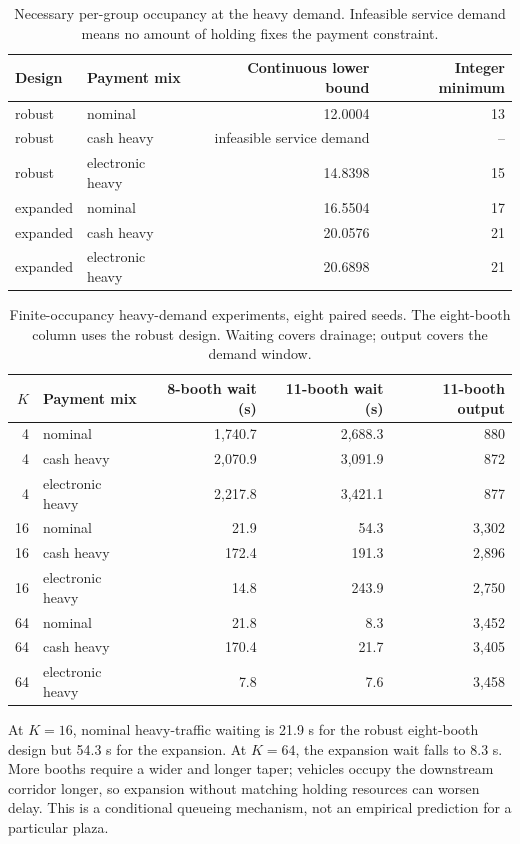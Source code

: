 \documentclass[12pt,letterpaper]{article}
\begin{document}
\begin{table}[H]\centering\small\caption{Necessary per-group occupancy at the heavy demand. Infeasible service demand means no amount of holding fixes the payment constraint.}\begin{tabular}{@{}llrr@{}}\toprule
Design & Payment mix & Continuous lower bound & Integer minimum\\\midrule
robust & nominal & 12.0004 & 13\\
robust & cash heavy & infeasible service demand & --\\
robust & electronic heavy & 14.8398 & 15\\
expanded & nominal & 16.5504 & 17\\
expanded & cash heavy & 20.0576 & 21\\
expanded & electronic heavy & 20.6898 & 21\\
\bottomrule\end{tabular}\end{table}
\begin{table}[H]\centering\small\caption{Finite-occupancy heavy-demand experiments, eight paired seeds. The eight-booth column uses the robust design. Waiting covers drainage; output covers the demand window.}\begin{tabular}{@{}rlrrr@{}}\toprule
$K$ & Payment mix & 8-booth wait (s) & 11-booth wait (s) & 11-booth output\\\midrule
4 & nominal & 1,740.7 & 2,688.3 & 880\\
4 & cash heavy & 2,070.9 & 3,091.9 & 872\\
4 & electronic heavy & 2,217.8 & 3,421.1 & 877\\
16 & nominal & 21.9 & 54.3 & 3,302\\
16 & cash heavy & 172.4 & 191.3 & 2,896\\
16 & electronic heavy & 14.8 & 243.9 & 2,750\\
64 & nominal & 21.8 & 8.3 & 3,452\\
64 & cash heavy & 170.4 & 21.7 & 3,405\\
64 & electronic heavy & 7.8 & 7.6 & 3,458\\
\bottomrule\end{tabular}\end{table}
At $K=16$, nominal heavy-traffic waiting is 21.9 s for the robust eight-booth design but 54.3 s for the expansion. At $K=64$, the expansion wait falls to 8.3 s. More booths require a wider and longer taper; vehicles occupy the downstream corridor longer, so expansion without matching holding resources can worsen delay. This is a conditional queueing mechanism, not an empirical prediction for a particular plaza.
\end{document}

